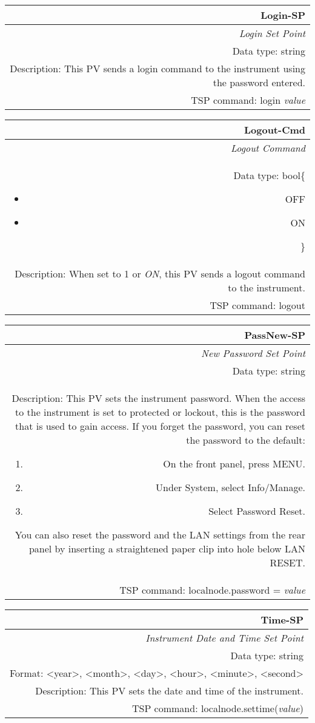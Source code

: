 \documentclass[openany]{article}
\begin{document}
		\begin{tabular}{N}
			\hline
			\bfseries Login-SP\label{pv:login-sp} \\ \hline
			\emph{Login Set Point} \\
			Data type: string \\
			Description: This PV sends a login command to the instrument using the password entered. \\
			TSP command: login \emph{value}
		\end{tabular}

		\begin{tabular}{N}
			\hline
			\bfseries Logout-Cmd\label{pv:logout-cmd} \\ \hline
			\emph{Logout Command} \\
			Data type: bool\{\begin{itemize}[noitemsep]
				\small
				\item[] OFF
				\item[] ON
			\end{itemize}\} \\
			Description: When set to 1 or \emph{ON}, this PV sends a logout command to the instrument. \\
			TSP command: logout
		\end{tabular}

		\begin{tabular}{N}
			\hline
			\bfseries PassNew-SP\label{pv:passnew-sp} \\ \hline
			\emph{New Password Set Point} \\
			Data type: string \\
			Description: This PV sets the instrument password. When the access to the instrument is set to protected or lockout, this is the password that is used to gain access. If you forget the password, you can reset the password to the default: \begin{enumerate} \item On the front panel, press MENU. \item Under System, select Info/Manage. \item Select Password Reset. \end{enumerate} You can also reset the password and the LAN settings from the rear panel by inserting a straightened paper clip into hole below LAN RESET. \\
			TSP command: localnode.password = \emph{value}
		\end{tabular}

		\begin{tabular}{N}
			\hline
			\bfseries Time-SP\label{pv:time-sp} \\ \hline
			\emph{Instrument Date and Time Set Point} \\
			Data type: string \\
			Format: \textless year\textgreater, \textless month\textgreater, \textless day\textgreater, \textless hour\textgreater, \textless minute\textgreater, \textless second\textgreater \\
			Description: This PV sets the date and time of the instrument. \\
			TSP command: localnode.settime(\emph{value})
		\end{tabular}
\end{document}
